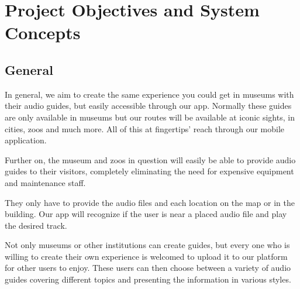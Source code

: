 \documentclass[12pt]{article}
\theoremstyle{definition}
\newenvironment{text}{
}{}
\begin{document}
\pagebreak
 
\section{Project Objectives and System Concepts}
 
\subsection{General}
\begin{text}
In general, we aim to create the same experience you could get in museums with their audio guides, but easily accessible through our app. Normally these guides are only available in museums but our routes will be available at iconic sights, in cities, zoos and much more. All of this at fingertips' reach through our mobile application. 

Further on, the museum and zoos in question will easily be able to provide audio guides to their visitors, completely eliminating the need for expensive equipment and maintenance staff.

They only have to provide the audio files and each location on the map or in the building. Our app will recognize if the user is near a placed audio file and play the desired track.

Not only museums or other institutions can create guides, but every one who is willing to create their own experience is welcomed to upload it to our platform for other users to enjoy. These users can then choose between a variety of audio guides covering different topics and presenting the information in various styles.
\end{text}
 
\end{document}
